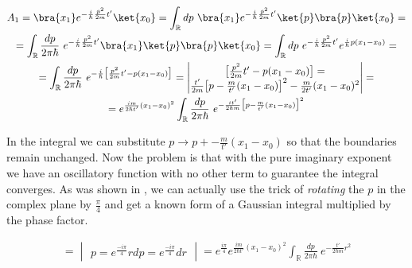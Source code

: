 \begin{equation*}
    \begin{gathered}
        A_{1} = \bra{x_{1}} e^{- \frac{i}{\hbar} \frac{\hat{p}^{2}}{2m} t'}\ket{x_{0}} = \int_{\mathbb{R}} dp \ \bra{x_{1}} e^{- \frac{i}{\hbar} \frac{\hat{p}^{2}}{2m} t'}\ket{p} \bra{p} \ket{x_{0}} = \\
        = \int_{\mathbb{R}} \frac{dp}{2 \pi \hbar} \ e^{- \frac{i}{\hbar} \frac{p^{2}}{2m} t'} \bra{x_{1}}\ket{p} \bra{p} \ket{x_{0}} = \int_{\mathbb{R}} dp \ e^{- \frac{i}{\hbar} \frac{p^{2}}{2m} t'} e^{\frac{i}{\hbar}p (x_{1} - x_{0})} = \\
        = \int_{\mathbb{R}} \frac{dp}{2 \pi \hbar} \ e^{- \frac{i}{\hbar} \big[\frac{p^{2}}{2m} t' - p (x_{1} - x_{0})\big]} = 
        \begin{vmatrix}
            \big[\frac{p^{2}}{2m} t' - p (x_{1} - x_{0})\big] =  \\
            \frac{t'}{2m} \big[p - \frac{m}{t'}(x_{1} - x_{0})\big]^{2} - \frac{m}{2t'}(x_{1} - x_{0})^{2} \\
        \end{vmatrix} = \\
        = e^{\frac{im}{2\hbar t'} (x_{1} - x_{0})^{2}} \int_{\mathbb{R}} \frac{dp}{2 \pi \hbar} \ e^{- \frac{i t'}{2 \hbar m} \big[p - \frac{m}{t'}(x_{1} - x_{0})\big]^{2}} \\
    \end{gathered}
\end{equation*}

In the integral we can substitute $p \to p + - \frac{m}{t'}(x_{1} - x_{0})$ so that the boundaries remain unchanged. Now
the problem is that with the pure imaginary exponent we have an oscillatory function with no other term to guarantee
the integral converges. As was shown in \cite{imaginary_gaussian_integral}, we can actually use the trick of \textit{rotating}
the $p$ in the complex plane by $\frac{\pi}{4}$ and get a known form of a Gaussian integral multiplied by the phase factor.

\begin{equation*}
    \begin{gathered}
        = \begin{vmatrix}
            p = e^{\frac{- i \pi}{4}} r
            dp = e^{\frac{- i \pi}{4}} dr
        \end{vmatrix}
        = e^{\frac{i \pi}{4}} e^{\frac{im}{2\hbar t'} (x_{1} - x_{0})^{2}} \int_{\mathbb{R}} \frac{dp}{2 \pi \hbar} \ e^{- \frac{t'}{2 \hbar m} r^{2}} \\
    \end{gathered}
\end{equation*}

